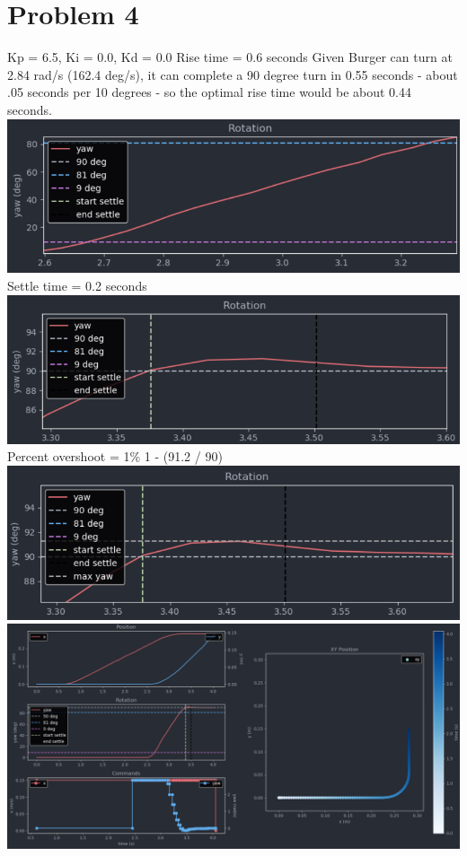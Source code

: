\documentclass{article}
\begin{document}
    \section*{Problem 4}
        \raggedright
        Kp = 6.5, Ki = 0.0, Kd = 0.0 \break
        Rise time = 0.6 seconds \break
        Given Burger can turn at 2.84 rad/s (162.4 deg/s), it can complete a 90 degree turn in 0.55 seconds - about .05 seconds per 10 degrees - so the optimal rise time would be about 0.44 seconds.
        \includegraphics[width=\linewidth]{Problem 4 Rise Time.png} \break
        Settle time = 0.2 seconds \break
        \includegraphics[width=\linewidth]{Problem 4 Settle Time.png} \break
        Percent overshoot = 1\% 1 - (91.2 / 90) \break
        \includegraphics[width=\linewidth]{Problem 4 Percent Overshoot.png} \break
        \includegraphics[width=\linewidth]{Problem 4 Telemetry.png}
\end{document}
